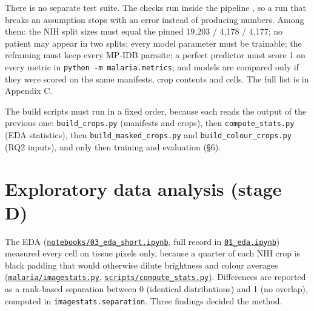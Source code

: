 \documentclass[11pt,a4paper]{article}
\begin{document}
There is no separate test suite. The checks run inside the pipeline \citep{beaulieujones2017}, so a run that breaks an assumption stops with an error instead of producing numbers. Among them: the NIH split sizes must equal the pinned 19,203 / 4,178 / 4,177; no patient may appear in two splits; every model parameter must be trainable; the reframing must keep every MP-IDB parasite; a perfect predictor must score 1 on every metric in \texttt{python -m malaria.\allowbreak{}metrics}; and models are compared only if they were scored on the same manifests, crop contents and cells. The full list is in Appendix C.

The build scripts must run in a fixed order, because each reads the output of the previous one: \texttt{build\_\allowbreak{}crops.\allowbreak{}py} (manifests and crops), then \texttt{compute\_\allowbreak{}stats.\allowbreak{}py} (EDA statistics), then \texttt{build\_\allowbreak{}masked\_\allowbreak{}crops.\allowbreak{}py} and \texttt{build\_\allowbreak{}colour\_\allowbreak{}crops.\allowbreak{}py} (RQ2 inputs), and only then training and evaluation (\S{}6).

\section{Exploratory data analysis (stage D)}

The EDA (\href{https://gitlab.uvt.nl/capstone/2026-fall/u927271/-/blob/v1.0-final/notebooks/03_eda_short.ipynb}{\texttt{notebooks/\allowbreak{}03\_\allowbreak{}eda\_\allowbreak{}short.\allowbreak{}ipynb}}, full record in \href{https://gitlab.uvt.nl/capstone/2026-fall/u927271/-/blob/v1.0-final/notebooks/01_eda.ipynb}{\texttt{01\_\allowbreak{}eda.\allowbreak{}ipynb}}) measured every cell on tissue pixels only, because a quarter of each NIH crop is black padding that would otherwise dilute brightness and colour averages (\href{https://gitlab.uvt.nl/capstone/2026-fall/u927271/-/blob/v1.0-final/malaria/imagestats.py}{\texttt{malaria/\allowbreak{}imagestats.\allowbreak{}py}}, \href{https://gitlab.uvt.nl/capstone/2026-fall/u927271/-/blob/v1.0-final/scripts/compute_stats.py}{\texttt{scripts/\allowbreak{}compute\_\allowbreak{}stats.\allowbreak{}py}}). Differences are reported as a rank-based separation between 0 (identical distributions) and 1 (no overlap), computed in \texttt{imagestats.\allowbreak{}separation}. Three findings decided the method.
\end{document}
